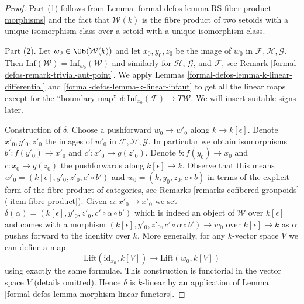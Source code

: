 \begin{proof}
Part (1) follows from Lemma \ref{formal-defos-lemma-RS-fiber-product-morphisms}
and the fact that $\mathcal{W}(k)$ is the fibre product of
two setoids with a unique isomorphism class over a setoid with
a unique isomorphism class.

\medskip\noindent
Part (2). Let $w_0 \in \Ob(\mathcal{W}(k))$ and let $x_0, y_0, z_0$ be
the image of $w_0$ in $\mathcal{F}, \mathcal{H}, \mathcal{G}$.
Then $\text{Inf}(\mathcal{W}) = \text{Inf}_{w_0}(\mathcal{W})$
and similarly for $\mathcal{H}$, $\mathcal{G}$, and $\mathcal{F}$, see
Remark \ref{formal-defos-remark-trivial-aut-point}.
We apply Lemmas \ref{formal-defos-lemma-k-linear-differential} and
\ref{formal-defos-lemma-k-linear-infaut} to get all the linear maps
except for the ``boundary map''
$\delta : \text{Inf}_{x_0}(\mathcal{F}) \to T\mathcal{W}$.
We will insert suitable signs later.

\medskip\noindent
Construction of $\delta$. Choose a pushforward $w_0 \to w'_0$ along
$k \to k[\epsilon]$. Denote $x'_0, y'_0, z'_0$ the images of $w'_0$ in
$\mathcal{F}, \mathcal{H}, \mathcal{G}$. In particular
we obtain isomorphisms $b' : f(y'_0) \to x'_0$ and $c' : x'_0 \to g(z'_0)$.
Denote $b : f(y_0) \to x_0$ and $c : x_0 \to g(z_0)$ the pushforwards
along $k[\epsilon] \to k$. Observe that this means
$w'_0 = (k[\epsilon], y'_0, z'_0, c' \circ b')$ and
$w_0 = (k, y_0, z_0, c \circ b)$ in terms of the explicit form
of the fibre product of categories,
see Remarks \ref{remarks-cofibered-groupoids} (\ref{item-fibre-product}).
Given $\alpha : x'_0 \to x'_0$ we set
$\delta(\alpha) = (k[\epsilon], y'_0, z'_0, c' \circ \alpha \circ b')$
which is indeed an object of $\mathcal{W}$ over $k[\epsilon]$ and comes
with a morphism $(k[\epsilon], y'_0, z'_0, c' \circ \alpha \circ b') \to w_0$
over $k[\epsilon] \to k$ as $\alpha$ pushes forward to the identity over $k$.
More generally, for any $k$-vector space $V$ we can define a map
$$
\text{Lift}(\text{id}_{x_0}, k[V])
\longrightarrow
\text{Lift}(w_0, k[V])
$$
using exactly the same formulae. This construction is functorial
in the vector space $V$ (details omitted). Hence $\delta$ is $k$-linear
by an application of
Lemma \ref{formal-defos-lemma-morphism-linear-functors}.


\end{proof}
